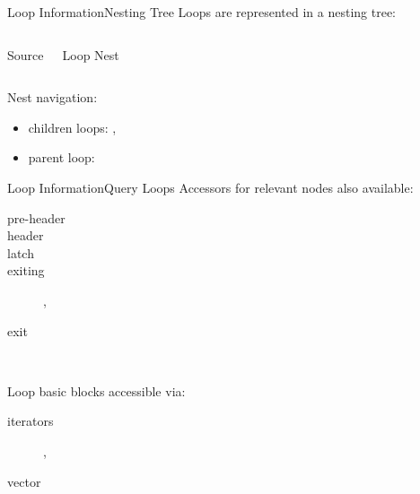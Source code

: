 \documentclass[10pt,mathserif]{beamer}
\begin{document}
\begin{frame}{Loop Information}{Nesting Tree}
Loops are represented in a \alert{nesting tree}:

\begin{columns}[t]
\begin{block}{Source}
\centering
{}
\end{block}

\begin{block}{Loop Nest}
\centering

\end{block}
\end{columns}

Nest navigation:

\begin{itemize}
\item children loops: ,
\item parent loop: 
\end{itemize}
\end{frame}

\begin{frame}{Loop Information}{Query Loops}
Accessors for relevant nodes also available:

\begin{description}
\item[pre-header] 
\item[header] 
\item[latch] 
\item[exiting] , \\
\item[exit]  \\
\end{description}

\vfill
Loop basic blocks accessible via:

\begin{description}
\item[iterators] , \\
\item[vector]
\end{description}
\end{frame}
\end{document}
